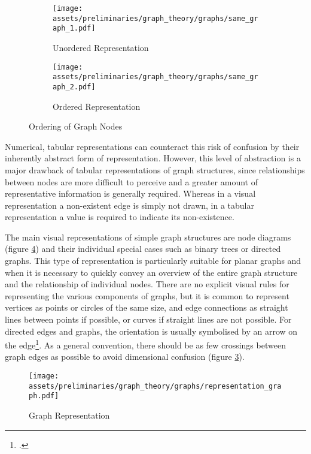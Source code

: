 \documentclass[a4paper, 12pt]{report}
\begin{document}
\begin{figure}
\centering
\begin{subfigure}{.5\textwidth}
\centering
\texttt{[image: assets/preliminaries/graph\_theory/graphs/same\_graph\_1.pdf]}
\caption{Unordered Representation}
\label{fig:unordered-representation}
\end{subfigure}%
\begin{subfigure}{.5\textwidth}
\centering
\texttt{[image: assets/preliminaries/graph\_theory/graphs/same\_graph\_2.pdf]}
\caption{Ordered Representation}
\label{fig:ordered-representation}
\end{subfigure}
\caption{Ordering of Graph Nodes}
\label{fig:ordering-of-graph-nodes}
\end{figure}

Numerical, tabular representations can counteract this risk of confusion by their inherently abstract form of representation. However, this level of abstraction is a major drawback of tabular representations of graph structures, since relationships between nodes are more difficult to perceive and a greater amount of representative information is generally required. Whereas in a visual representation a non-existent edge is simply not drawn, in a tabular representation a value is required to indicate its non-existence.

The main visual representations of simple graph structures are node diagrams (figure \ref{fig:2d-representation}) and their individual special cases such as \glspl{binary tree} or directed graphs. This type of representation is particularly suitable for planar graphs and when it is necessary to quickly convey an overview of the entire graph structure and the relationship of individual nodes. There are no explicit visual rules for representing the various components of graphs, but it is common to represent vertices as points or circles of the same size, and edge connections as straight lines between points if possible, or curves if straight lines are not possible. For directed edges and graphs, the orientation is usually symbolised by an arrow on the edge\footcite{wilson1979introduction}. As a general convention, there should be as few crossings between graph edges as possible to avoid dimensional confusion (figure \ref{fig:ordering-of-graph-nodes}).

\begin{figure}
\centering
\texttt{[image: assets/preliminaries/graph\_theory/graphs/representation\_graph.pdf]}
\caption{Graph Representation}
\label{fig:2d-representation}
\end{figure}
\end{document}
